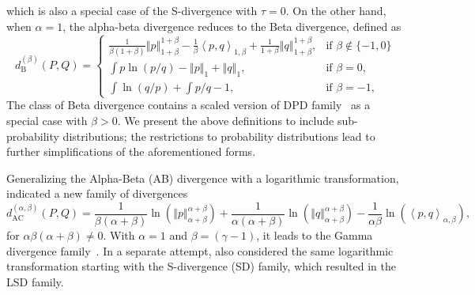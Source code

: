 \documentclass[11pt]{article}
\theoremstyle{plain}
\theoremstyle{remark}
\newcommand{\norm}[1]{\left\Vert #1 \right\Vert}
\newcommand{\inner}[1]{\left\langle #1\right\rangle}
\begin{document}
\noindent which is also a special case of the S-divergence with $\tau = 0$. On the other hand, when $\alpha = 1$, the alpha-beta divergence reduces to the Beta divergence, defined as
\begin{equation}
    d_{\mathrm{B}}^{(\beta)}(P, Q)
    = \begin{cases}
        \frac{1}{\beta(1+\beta)}\norm{p}_{1+\beta}^{1+\beta} - \frac{1}{\beta}\inner{p, q}_{1,\beta} + \frac{1}{1+\beta}\norm{q}_{1+\beta}^{1+\beta}, & \text{if } \beta \notin \{ -1, 0 \} \\
        \int p\ln(p/q) - \norm{p}_1 + \norm{q}_1,                                                                                                     & \text{if } \beta = 0,               \\
        \int \ln(q/p) + \int p/q - 1,                                                                                                                 & \text{if } \beta = -1,
    \end{cases}
    \label{eqn:defn-b-div}
\end{equation}
\noindent The class of Beta divergence contains a scaled version of DPD family~\citep{basu1998robust} as a special case with $\beta > 0$. We present the above definitions to include sub-probability distributions; the restrictions to probability distributions lead to further simplifications of the aforementioned forms.

Generalizing the Alpha-Beta (AB) divergence with a logarithmic transformation, \cite{cichocki2011generalized} indicated a new family of divergences
\begin{equation}
    d_{\mathrm{AC}}^{(\alpha,\beta)}(P, Q)
    = \frac{1}{\beta(\alpha+\beta)} \ln\left( \norm{p}_{\alpha+\beta}^{\alpha+\beta} \right)
    + \frac{1}{\alpha(\alpha+\beta)} \ln\left( \norm{q}_{\alpha+\beta}^{\alpha+\beta} \right)
    - \frac{1}{\alpha\beta} \ln\left( \inner{p,q}_{\alpha,\beta} \right),
    \label{eqn:defn-ac-div}
\end{equation}
\noindent for $\alpha \beta (\alpha+\beta) \neq 0$. With $\alpha = 1$ and $\beta = (\gamma -1)$, it leads to the Gamma divergence family~\citep{cichocki2010families}. In a separate attempt, \cite{maji2014logarithmic,maji2016logarithmic} also considered the same logarithmic transformation starting with the S-divergence (SD) family, which resulted in the LSD family.
\end{document}
